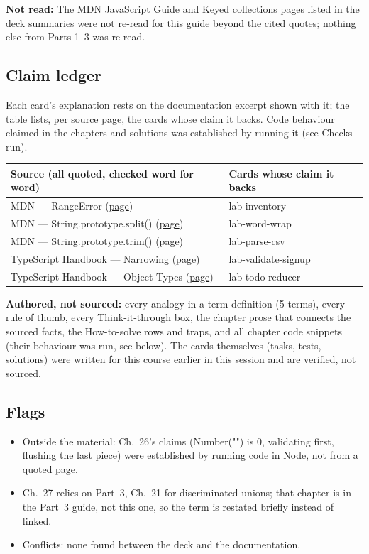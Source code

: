 \documentclass[10pt]{article}
\begin{document}
{\footnotesize\textbf{Not read:} The MDN JavaScript Guide and Keyed collections pages listed in the deck summaries were not re-read for this guide beyond the cited quotes; nothing else from Parts 1–3 was re-read.}
\subsection*{Claim ledger}
{\footnotesize Each card's explanation rests on the documentation excerpt shown with it; the table lists, per source page, the cards whose claim it backs. Code behaviour claimed in the chapters and solutions was established by running it (see Checks run).}
{\footnotesize\begin{tabularx}{\linewidth}{@{}p{2.2in}X@{}}\toprule
\textbf{Source (all quoted, checked word for word)} & \textbf{Cards whose claim it backs}\\\midrule
MDN — RangeError (\href{https://developer.mozilla.org/en-US/docs/Web/JavaScript/Reference/Global_Objects/RangeError}{page}) & lab-inventory\\
MDN — String.prototype.split() (\href{https://developer.mozilla.org/en-US/docs/Web/JavaScript/Reference/Global_Objects/String/split}{page}) & lab-word-wrap\\
MDN — String.prototype.trim() (\href{https://developer.mozilla.org/en-US/docs/Web/JavaScript/Reference/Global_Objects/String/trim}{page}) & lab-parse-csv\\
TypeScript Handbook — Narrowing (\href{https://www.typescriptlang.org/docs/handbook/2/narrowing.html}{page}) & lab-validate-signup\\
TypeScript Handbook — Object Types (\href{https://www.typescriptlang.org/docs/handbook/2/objects.html}{page}) & lab-todo-reducer\\
\bottomrule\end{tabularx}}
{\footnotesize\textbf{Authored, not sourced:} every analogy in a term definition (5 terms), every rule of thumb, every Think-it-through box, the chapter prose that connects the sourced facts, the How-to-solve rows and traps, and all chapter code snippets (their behaviour was run, see below). The cards themselves (tasks, tests, solutions) were written for this course earlier in this session and are verified, not sourced.}
\subsection*{Flags}
{\footnotesize\begin{itemize}
\item Outside the material: Ch.~26's claims (Number("") is 0, validating first, flushing the last piece) were established by running code in Node, not from a quoted page.
\item Ch.~27 relies on Part~3, Ch.~21 for discriminated unions; that chapter is in the Part~3 guide, not this one, so the term is restated briefly instead of linked.
\item Conflicts: none found between the deck and the documentation.
\end{itemize}}
\end{document}
